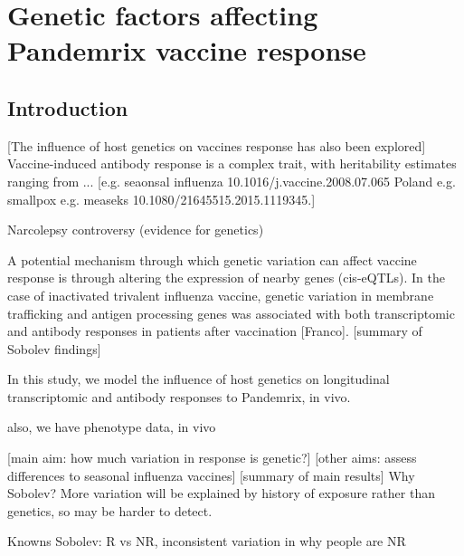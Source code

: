 %
%

\chapter{Genetic factors affecting Pandemrix vaccine response}

\section{Introduction}


[The influence of host genetics on vaccines response has also been explored]
Vaccine-induced antibody response is a complex trait, with heritability estimates ranging from ... [e.g. seaonsal influenza 10.1016/j.vaccine.2008.07.065 Poland e.g. smallpox e.g. measeks 10.1080/21645515.2015.1119345.]

Narcolepsy controversy (evidence for genetics)

A potential mechanism through which genetic variation can affect vaccine response is through altering the expression of nearby genes (cis-eQTLs).
In the case of inactivated trivalent influenza vaccine, genetic variation in membrane trafficking and antigen processing genes was associated with both transcriptomic and antibody responses in patients after vaccination [Franco].
[summary of Sobolev findings]


In this study, we model the influence of host genetics on longitudinal transcriptomic and antibody responses to Pandemrix, in vivo.

also, we have phenotype data, in vivo

[main aim: how much variation in response is genetic?]
[other aims: assess differences to seasonal influenza vaccines]
[summary of main results]
Why Sobolev?
More variation will be explained by history of exposure rather than genetics, so may be harder to detect.

Knowns
    Sobolev: R vs NR, 
    inconsistent variation in why people are NR


